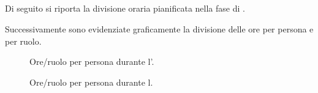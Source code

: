 \newcommand{\intropreventivo}[1]{
	Di seguito si riporta la divisione oraria pianificata nella fase di #1.

	Successivamente sono evidenziate graficamente la divisione delle ore per persona e per ruolo. 
}

\newcommand{\introcosto}[1]{
	Di seguito si riporta il costo della #1.
}

\pagebreak[4]
\subsection{\AR}

\intropreventivo{\AR}
\begin{figure}[H]
\caption{Ore/ruolo per persona durante l'\AR.}

\end{figure}

\pagebreak


\begin{figure}[H]
\caption{Ore/ruolo per persona durante l\AR.}
\label{fig:ar1}

\end{figure}

